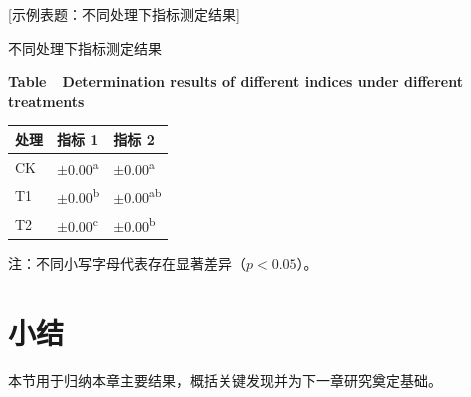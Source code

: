 \begin{center}
	[示例表题：不同处理下指标测定结果]{不同处理下指标测定结果\par
		{\qauTimes\fontsize{10.5bp}{15.75bp}\selectfont \textbf{Table~\thetable\ Determination results of different indices under different treatments}}}
	\label{tab:ch2-example}
	\renewcommand{\arraystretch}{1.5}
	{\songti{}
		\begin{tabular*}{0.85\textwidth}{@{\extracolsep{\fill}}>{\centering\arraybackslash}m{}>{\centering\arraybackslash}m{}>{\centering\arraybackslash}m{}}
			\toprule
			处理 & 指标 1 & 指标 2 \\
			\midrule
			CK & 0.00$\pm$0.00\textsuperscript{a} & 0.00$\pm$0.00\textsuperscript{a} \\
			T1 & 0.00$\pm$0.00\textsuperscript{b} & 0.00$\pm$0.00\textsuperscript{ab} \\
			T2 & 0.00$\pm$0.00\textsuperscript{c} & 0.00$\pm$0.00\textsuperscript{b} \\
			\bottomrule
		\end{tabular*}
		\par
		{\center 注：不同小写字母代表存在显著差异（$p<0.05$）。\par}
	}
\end{center}

\section{小结}\label{sec:ch2-summary}

本节用于归纳本章主要结果，概括关键发现并为下一章研究奠定基础。
